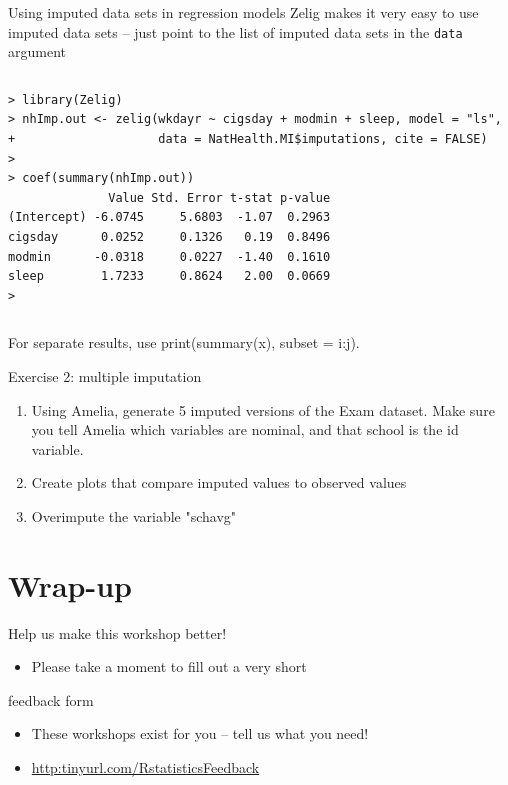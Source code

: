 \documentclass[table,smaller]{beamer}
\begin{document}
\begin{frame}[fragile,label=sec-6-6]{Using imputed data sets in regression models}
 Zelig makes it very easy to use imputed data sets -- just point to the list of imputed data sets in the \verb~data~ argument

\vspace{-.5em}
\begin{columns}
\begin{block}{}
\begin{verbatim}
> library(Zelig)
> nhImp.out <- zelig(wkdayr ~ cigsday + modmin + sleep, model = "ls",
+                    data = NatHealth.MI$imputations, cite = FALSE)
> 
> coef(summary(nhImp.out))
              Value Std. Error t-stat p-value
(Intercept) -6.0745     5.6803  -1.07  0.2963
cigsday      0.0252     0.1326   0.19  0.8496
modmin      -0.0318     0.0227  -1.40  0.1610
sleep        1.7233     0.8624   2.00  0.0669
>
\end{verbatim}
\end{block}
\end{columns}
\vspace{.5em}


For separate results, use print(summary(x), subset = i:j).
\end{frame}

\begin{frame}[label=sec-6-7]{Exercise 2: multiple imputation}
\begin{enumerate}
\item Using Amelia, generate 5 imputed versions of the Exam dataset. Make sure you tell Amelia which variables are nominal, and that school is the id variable.
\item Create plots that compare imputed values to observed values
\item Overimpute the variable "schavg"
\end{enumerate}
\end{frame}

\section{Wrap-up}
\label{sec-7}

\begin{frame}[label=sec-7-1]{Help us make this workshop better!}
\begin{itemize}
\item Please take a moment to fill out a very short
\end{itemize}
feedback form 
\begin{itemize}
\item These workshops exist for you -- tell us what you need!
\item \url{http:tinyurl.com/RstatisticsFeedback}
\end{itemize}
\end{frame}
\end{document}
